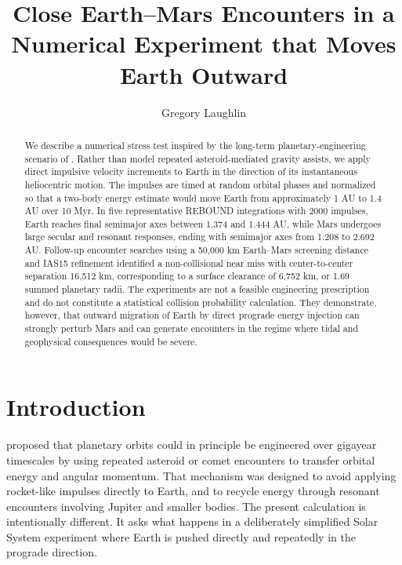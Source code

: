 \documentclass[twocolumn]{aastex631}
\begin{document}
\title{Close Earth--Mars Encounters in a Numerical Experiment that Moves Earth Outward}

\author{Gregory Laughlin}

\begin{abstract}
We describe a numerical stress test inspired by the long-term planetary-engineering scenario of \citet{korycansky2001}.  Rather than model repeated asteroid-mediated gravity assists, we apply direct impulsive velocity increments to Earth in the direction of its instantaneous heliocentric motion.  The impulses are timed at random orbital phases and normalized so that a two-body energy estimate would move Earth from approximately 1 AU to 1.4 AU over 10 Myr.  In five representative REBOUND integrations with 2000 impulses, Earth reaches final semimajor axes between 1.374 and 1.444 AU, while Mars undergoes large secular and resonant responses, ending with semimajor axes from 1.208 to 2.692 AU.  Follow-up encounter searches using a 50,000 km Earth--Mars screening distance and IAS15 refinement identified a non-collisional near miss with center-to-center separation 16,512 km, corresponding to a surface clearance of 6,752 km, or 1.69 summed planetary radii.  The experiments are not a feasible engineering prescription and do not constitute a statistical collision probability calculation.  They demonstrate, however, that outward migration of Earth by direct prograde energy injection can strongly perturb Mars and can generate encounters in the regime where tidal and geophysical consequences would be severe.
\end{abstract}


\section{Introduction}

\citet{korycansky2001} proposed that planetary orbits could in principle be engineered over gigayear timescales by using repeated asteroid or comet encounters to transfer orbital energy and angular momentum.  That mechanism was designed to avoid applying rocket-like impulses directly to Earth, and to recycle energy through resonant encounters involving Jupiter and smaller bodies.  The present calculation is intentionally different.  It asks what happens in a deliberately simplified Solar System experiment where Earth is pushed directly and repeatedly in the prograde direction.
\end{document}

